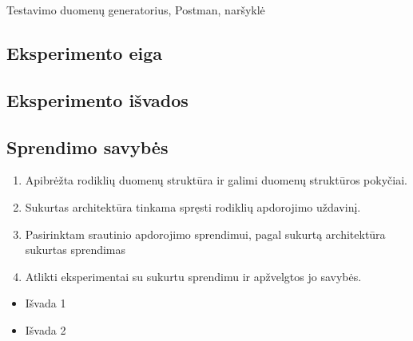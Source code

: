 \documentclass{VUMIFPSbakalaurinis}
\begin{document}
Testavimo duomenų generatorius, Postman, naršyklė

\subsection{Eksperimento eiga}

\subsection{Eksperimento išvados}

\subsection{Sprendimo savybės}


\begin{enumerate}
    \item Apibrėžta rodiklių duomenų struktūra ir galimi duomenų struktūros pokyčiai.
    \item Sukurtas architektūra tinkama spręsti rodiklių apdorojimo uždavinį. 
    \item Pasirinktam srautinio apdorojimo sprendimui, pagal sukurtą architektūra sukurtas sprendimas
    \item Atlikti eksperimentai su sukurtu sprendimu ir apžvelgtos jo savybės. 
\end{enumerate}

\begin{itemize}
    \item Išvada 1
    \item Išvada 2 
\end{itemize}

\printbibliography[heading=bibintoc] 


\end{document}
